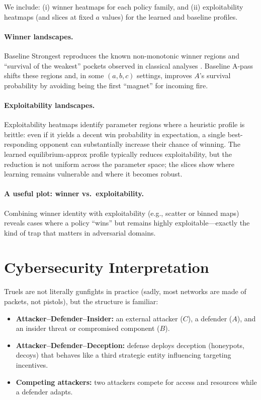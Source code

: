 \documentclass[11pt]{article}
\begin{document}
We include:
(i) winner heatmaps for each policy family, and
(ii) exploitability heatmaps (and slices at fixed $a$ values) for the learned and baseline profiles.

\paragraph{Winner landscapes.}
Baseline Strongest reproduces the known non-monotonic winner regions and ``survival of the weakest'' pockets observed in classical analyses \citep{AmengualToral2006,DorrakiAllisonAbbott2019}.
Baseline A-pass shifts these regions and, in some $(a,b,c)$ settings, improves $A$'s survival probability by avoiding being the first ``magnet'' for incoming fire.

\paragraph{Exploitability landscapes.}
Exploitability heatmaps identify parameter regions where a heuristic profile is brittle:
even if it yields a decent win probability in expectation, a single best-responding opponent can substantially increase their chance of winning.
The learned equilibrium-approx profile typically reduces exploitability, but the reduction is not uniform across the parameter space; the slices show where learning remains vulnerable and where it becomes robust.

\paragraph{A useful plot: winner vs.\ exploitability.}
Combining winner identity with exploitability (e.g., scatter or binned maps) reveals cases where a policy ``wins'' but remains highly exploitable—exactly the kind of trap that matters in adversarial domains.

\section{Cybersecurity Interpretation}

Truels are not literally gunfights in practice (sadly, most networks are made of packets, not pistols), but the structure is familiar:

\begin{itemize}
  \item \textbf{Attacker--Defender--Insider:} an external attacker ($C$), a defender ($A$), and an insider threat or compromised component ($B$).
  \item \textbf{Attacker--Defender--Deception:} defense deploys deception (honeypots, decoys) that behaves like a third strategic entity influencing targeting incentives.
  \item \textbf{Competing attackers:} two attackers compete for access and resources while a defender adapts.
\end{itemize}
\end{document}
